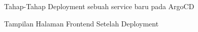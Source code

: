 \begin{figure}[H]
  \centering
  \caption{Tahap-Tahap Deployment sebuah service baru pada ArgoCD}
  \label{fig:flow-deployment-gambar-argo-manual}
\end{figure}
\begin{figure}[H]
  \centering
  \caption{Tampilan Halaman Frontend Setelah Deployment}
  \label{fig:htmx-frontend-welcome-muhammad-zein}
\end{figure}

